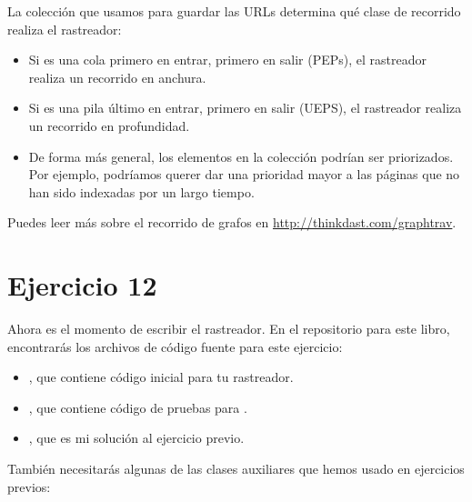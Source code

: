 \documentclass[12pt]{book}
\theoremstyle{exercise}
\begin{document}

La colección que usamos para guardar las URLs determina qué clase de
recorrido realiza el rastreador:

\begin{itemize}

\item
  Si es una cola primero en entrar, primero en salir (PEPs), el rastreador
  realiza un recorrido en anchura.

\item
  Si es una pila último en entrar, primero en salir (UEPS), el rastreador
  realiza un recorrido en profundidad.

\item
  De forma más general, los elementos en la colección podrían ser priorizados.
  Por ejemplo, podríamos querer dar una prioridad mayor a las páginas que no
  han sido indexadas por un largo tiempo.

\end{itemize}

Puedes leer más sobre el recorrido de grafos en
\url{http://thinkdast.com/graphtrav}.


\section{Ejercicio 12}
\label{exercise12}


Ahora es el momento de escribir el rastreador. En el repositorio para este libro,
encontrarás los archivos de código fuente para este ejercicio:

\begin{itemize}

\item {}, que contiene código inicial para tu rastreador.

\item {}, que contiene código de pruebas para
  .

\item {}, que es mi solución al ejercicio previo.

\end{itemize}


También necesitarás algunas de las clases auxiliares que hemos usado en
ejercicios previos:
\end{document}
